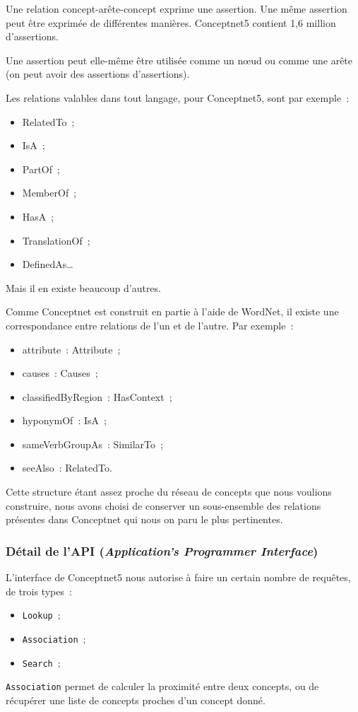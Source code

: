 \documentclass[a4paper, 12pt]{article}
\newcommand{\ang}[1]{\textit{#1}}%
\begin{document}
Une relation concept-arête-concept exprime une assertion. Une même assertion peut être exprimée de différentes manières. Conceptnet5 contient 1,6 million d'assertions.

Une assertion peut elle-même être utilisée comme un n\oe{}ud ou comme une arête (on peut avoir des assertions d'assertions).

Les relations valables dans tout langage, pour Conceptnet5, sont par exemple~:
\begin{itemize}
 \item RelatedTo~;
 \item IsA~;
 \item PartOf~;
 \item MemberOf~;
 \item HasA~;
 \item TranslationOf~;
 \item DefinedAs\ldots{}
\end{itemize}

Mais il en existe beaucoup d'autres.

Comme Conceptnet est construit en partie à l'aide de WordNet, il existe une correspondance entre relations de l'un et de l'autre. Par exemple~:
\begin{itemize}
 \item attribute~: Attribute~;
 \item causes~: Causes~;
 \item classifiedByRegion~: HasContext~;
 \item hyponymOf~: IsA~;
 \item sameVerbGroupAs~: SimilarTo~;
 \item seeAlso~: RelatedTo.
\end{itemize}

Cette structure étant assez proche du réseau de concepts que nous voulions construire, nous avons choisi de conserver un sous-ensemble des relations présentes dans Conceptnet qui nous on paru le plus pertinentes.

\subsubsection{Détail de l'API (\ang{Application's Programmer Interface})}

L'interface de Conceptnet5 nous autorise à faire un certain nombre de requêtes, de trois types~:
\begin{itemize}
 \item \texttt{Lookup}~;
 \item \texttt{Association}~;
 \item \texttt{Search}~;
\end{itemize}
\texttt{Association} permet de calculer la proximité entre deux concepts, ou de récupérer une liste de concepts proches d'un concept donné.
\end{document}
